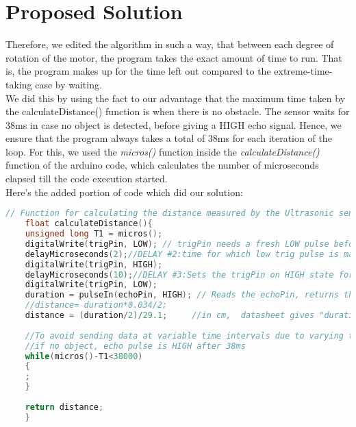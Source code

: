 \section{Proposed Solution}
Therefore, we edited the algorithm in such a way, that between each degree of rotation of the motor, the program takes the exact amount of time to run. That is, the program makes up for the time left out compared to the extreme-time-taking case by waiting.\\
We did this by using the fact to our advantage that the maximum time taken by the calculateDistance() function is when there is no obstacle. The \hcsr{} sensor waits for 38ms in case no object is detected, before giving a HIGH echo signal. Hence, we ensure that the program always takes a total of 38ms for each iteration of the loop. For this, we used the \emph{micros()} function inside the \textit{calculateDistance()} function of the arduino code, which calculates the number of microseconds elapsed till the code execution started.\\
Here's the added portion of code which did our solution:
\begin{mdframed}[backgroundcolor=light-gray, roundcorner=10pt,leftmargin=1, rightmargin=1, innerleftmargin=15, innertopmargin=15,innerbottommargin=15, outerlinewidth=1, linecolor=light-gray]
	\begin{lstlisting}[caption={Corrected calculateDistance() function},language = C]
	// Function for calculating the distance measured by the Ultrasonic sensor
	float calculateDistance(){ 
	unsigned long T1 = micros();
	digitalWrite(trigPin, LOW); // trigPin needs a fresh LOW pulse before sending a HIGH pulse that can be detected from echoPin
	delayMicroseconds(2);//DELAY #2:time for which low trig pulse is maintained before making it high
	digitalWrite(trigPin, HIGH); 
	delayMicroseconds(10);//DELAY #3:Sets the trigPin on HIGH state for 10 micro seconds
	digitalWrite(trigPin, LOW);
	duration = pulseIn(echoPin, HIGH); // Reads the echoPin, returns the sound wave travel time in microseconds
	//distance= duration*0.034/2;
	distance = (duration/2)/29.1;     //in cm,  datasheet gives "duration/58" as the formula
	
	//To avoid sending data at variable time intervals due to varying time duration taken between execution of above code inside this function depending on distance of obstacle
	//if no object, echo pulse is HIGH after 38ms
	while(micros()-T1<38000)
	{
	;
	}
	
	return distance;
	}
	\end{lstlisting}
	\end{mdframed}

